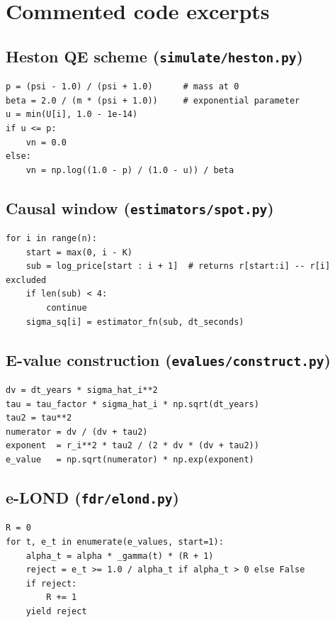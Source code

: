 \documentclass[11pt,a4paper,twocolumn]{article}
\theoremstyle{plain}
\theoremstyle{definition}
\theoremstyle{remark}
\begin{document}
\section{Commented code excerpts}
\label{ann:code}

\subsection{Heston QE scheme (\texttt{simulate/heston.py})}

\begin{lstlisting}[caption={Case $\psi > 1.5$ (high dispersion) in the QE scheme.}]
p = (psi - 1.0) / (psi + 1.0)      # mass at 0
beta = 2.0 / (m * (psi + 1.0))     # exponential parameter
u = min(U[i], 1.0 - 1e-14)
if u <= p:
    vn = 0.0
else:
    vn = np.log((1.0 - p) / (1.0 - u)) / beta
\end{lstlisting}

\subsection{Causal window (\texttt{estimators/spot.py})}

\begin{lstlisting}[caption={Window excluding the tested point i.}]
for i in range(n):
    start = max(0, i - K)
    sub = log_price[start : i + 1]  # returns r[start:i] -- r[i] excluded
    if len(sub) < 4:
        continue
    sigma_sq[i] = estimator_fn(sub, dt_seconds)
\end{lstlisting}

\subsection{E-value construction (\texttt{evalues/construct.py})}

\begin{lstlisting}[caption={GROW formula.}]
dv = dt_years * sigma_hat_i**2
tau = tau_factor * sigma_hat_i * np.sqrt(dt_years)
tau2 = tau**2
numerator = dv / (dv + tau2)
exponent  = r_i**2 * tau2 / (2 * dv * (dv + tau2))
e_value   = np.sqrt(numerator) * np.exp(exponent)
\end{lstlisting}

\subsection{e-LOND (\texttt{fdr/elond.py})}

\begin{lstlisting}[caption={Main loop.}]
R = 0
for t, e_t in enumerate(e_values, start=1):
    alpha_t = alpha * _gamma(t) * (R + 1)
    reject = e_t >= 1.0 / alpha_t if alpha_t > 0 else False
    if reject:
        R += 1
    yield reject
\end{lstlisting}
\end{document}
